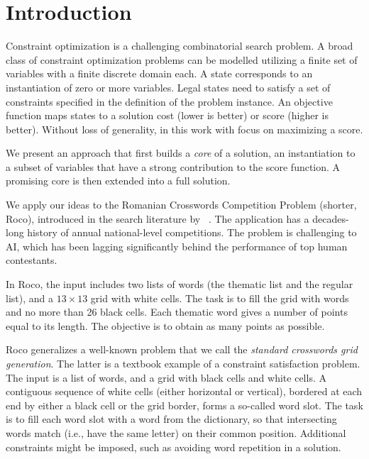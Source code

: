 \section{Introduction}
\label{sec::intro}


Constraint optimization 
is a challenging combinatorial search problem.
A broad class of constraint optimization problems can be modelled utilizing
a finite set of variables with a finite discrete domain each. 
A state corresponds to an instantiation of zero or more variables. 
Legal states need to satisfy a set of constraints specified in the definition of the problem instance.
An objective function maps states to a solution cost (lower is better) or score (higher is better).
Without loss of generality, in this work with focus on maximizing a score.

We present an approach that first builds a \emph{core} of a solution,
an instantiation to a subset of variables that have a strong contribution
to the score function.
A promising core is then extended into a full solution.

We apply our ideas to the Romanian Crosswords Competition Problem (shorter, {\sc Roco}),
introduced in the search literature by
\citeauthor{DBLP:conf/socs/BoteaB21}~.
The application has a decades-long history of annual national-level competitions.
The problem is challenging to AI, which has been lagging significantly
behind the performance of top human contestants.

In {\sc Roco}, the input includes two lists of words (the thematic list and the regular list),
and a $13 \times 13$ grid with white cells.
The task is to fill the grid with words and no more than 26 black cells.
Each thematic word gives a number of points equal to its length. The objective
is to obtain as many points as possible.

{\sc Roco} generalizes a well-known problem that we
call the \emph{standard crosswords grid generation}.
The latter is a textbook example of a constraint satisfaction problem.
The input is a list of words, and a grid with black cells and white cells.
A contiguous sequence of white cells (either horizontal or vertical), bordered at 
each end by either a black cell or the grid border, forms a so-called word slot.
The task is to fill each word slot with a word from the dictionary, so that
intersecting words match (i.e., have the same letter) on their common position.
Additional constraints might be imposed, such as avoiding word repetition in a solution.


